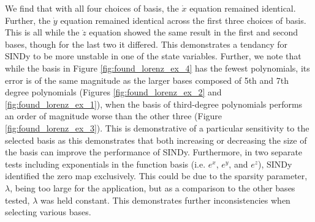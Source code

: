 \documentclass[10pt]{paper}
\begin{document}
We find that with all four choices of basis, the $\dot x$ equation remained identical. Further, the $\dot y$ equation remained identical across the first three choices of basis. This is all while the $\dot z$ equation showed the same result in the first and second bases, though for the last two it differed. 
This demonstrates a tendancy for SINDy to be more unstable in one of the state variables. Further, we note that while the basis in Figure \ref{fig:found_lorenz_ex_4} has the fewest polynomials, its error is of the same magnitude as the larger bases composed of 5th and 7th degree polynomials (Figures \ref{fig:found_lorenz_ex_2} and \ref{fig:found_lorenz_ex_1}), when the basis of third-degree polynomials performs an order of magnitude worse than the other three (Figure \ref{fig:found_lorenz_ex_3}). 
This is demonstrative of a particular sensitivity to the selected basis as this demonstrates that both increasing or decreasing the size of the basis can improve the performance of SINDy. 
Furthermore, in two separate tests including exponentials in the function basis (i.e. $e^x$, $e^y$, and $e^z$), SINDy identified the zero map exclusively. This could be due to the sparsity parameter, $\lambda$, being too large for the application, but as a comparison to the other bases tested, $\lambda$ was held constant. 
This demonstrates further inconsistencies when selecting various bases. 
\end{document}
